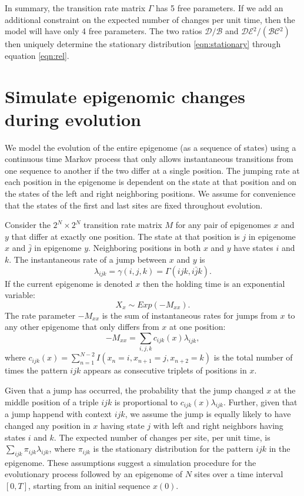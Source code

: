\documentclass[11pt]{article}
\newcommand{\birth}{\ensuremath{\mathcal{B}}}
\newcommand{\death}{\ensuremath{\mathcal{D}}}
\newcommand{\expansion}{\ensuremath{\mathcal{E}}}
\newcommand{\contraction}{\ensuremath{\mathcal{C}}}
\begin{document}
In summary, the transition rate matrix $\Gamma$ has 5 free
parameters. If we add an additional constraint on the expected number
of changes per unit time, then the model will have only 4 free
parameters. The two ratios $\death{}/\birth{}$ and
$\death{}\expansion{}^2/(\birth{}\contraction{}^2)$ then uniquely
determine the stationary distribution \eqref{eqn:stationary} through
equation \eqref{eqn:rel}.

\section{Simulate epigenomic changes during evolution}


We model the evolution of the entire epigenome (as a sequence of
states) using a continuous time Markov process that only allows
instantaneous transitions from one sequence to another if the two
differ at a single position. The jumping rate at each position in the
epigenome is dependent on the state at that position and on the states
of the left and right neighboring positions. We assume for convenience
that the states of the first and last sites are fixed throughout
evolution.

Consider the $2^N \times 2^N$ transition rate matrix $M$ for any pair
of epigenomes $x$ and $y$ that differ at exactly one position. The
state at that position is $j$ in epigenome $x$ and $\bar{j}$ in
epigenome $y$. Neighboring positions in both $x$ and $y$ have states
$i$ and $k$. The instantaneous rate of a jump between $x$ and $y$
is
\[
\lambda_{ijk} = \gamma(i, j, k) = \Gamma(ijk, i\bar{j}k).
\]
If the current epigenome is denoted $x$ then the holding time
is an exponential variable:
\[
  X_x\sim \mathit{Exp}(-M_{xx}).
\]
The rate parameter $-M_{xx}$ is the sum of instantaneous rates for
jumps from $x$ to any other epigenome that only differs from $x$ at
one position:
\[
  -M_{xx} =  \sum\limits_{i,j,k}c_{ijk}(x)\lambda_{ijk},
\]
where $c_{ijk}(x) = \sum_{n=1}^{N-2}I(x_{n}=i, x_{n+1}=j, x_{n+2}=k)$
is the total number of times the pattern $ijk$ appears as consecutive
triplets of positions in $x$.

Given that a jump has occurred, the probability that the jump changed
$x$ at the middle position of a triple $ijk$ is proportional to
$c_{ijk}(x)\lambda_{ijk}$. Further, given that a jump happend with
context $ijk$, we assume the jump is equally likely to have changed
any position in $x$ having state $j$ with left and right neighbors
having states $i$ and $k$.
The expected number of changes per site, per unit time, is
$\sum_{ijk}\pi_{ijk}\lambda_{ijk}$, where $\pi_{ijk}$ is the
stationary distribution for the pattern $ijk$ in the epigenome.
These assumptions suggest a simulation procedure for the evolutionary
process followed by an epigenome of $N$ sites over a time interval
$[0, T]$, starting from an initial sequence $x(0)$.
\end{document}
